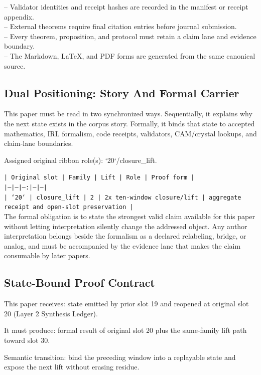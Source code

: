 \documentclass[11pt]{article}
\begin{document}
\noindent{}-- Validator identities and receipt hashes are recorded in the manifest or receipt appendix.\\
\noindent{}-- External theorems require final citation entries before journal submission.\\
\noindent{}-- Every theorem, proposition, and protocol must retain a claim lane and evidence boundary.\\
\noindent{}-- The Markdown, LaTeX, and PDF forms are generated from the same canonical source.\\

\subsection*{Dual Positioning: Story And Formal Carrier}

This paper must be read in two synchronized ways. Sequentially, it explains why
the next state exists in the corpus story. Formally, it binds that state to
accepted mathematics, IRL formalism, code receipts, validators, CAM/crystal
lookups, and claim-lane boundaries.

Assigned original ribbon role(s): `20`/closure\_lift.

\noindent\texttt{| Original slot | Family | Lift | Role | Proof form |}\\
\noindent\texttt{|---|---|---:|---|---|}\\
\noindent\texttt{| `20` | closure\_lift | 2 | 2x ten-window closure/lift | aggregate receipt and open-slot preservation |}\\

The formal obligation is to state the strongest valid claim available for this
paper without letting interpretation silently change the addressed object. Any
author interpretation belongs beside the formalism as a declared relabeling,
bridge, or analog, and must be accompanied by the evidence lane that makes the
claim consumable by later papers.

\subsection*{State-Bound Proof Contract}

This paper receives: state emitted by prior slot 19 and reopened at original slot 20 (Layer 2 Synthesis Ledger).

It must produce: formal result of original slot 20 plus the same-family lift path toward slot 30.

Semantic transition: bind the preceding window into a replayable state and expose the next lift without erasing residue.
\end{document}
